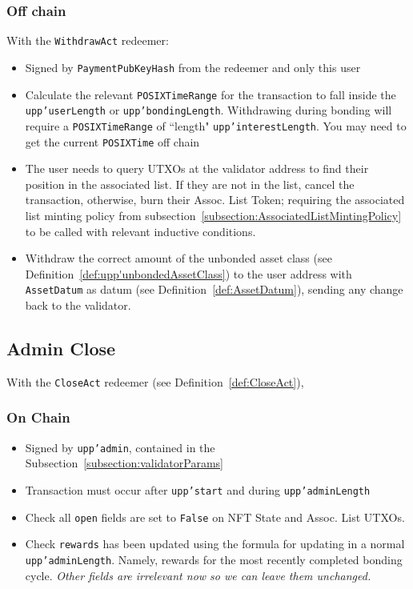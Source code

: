 \documentclass[10pt, a4paper]{article}
\theoremstyle{definition}
\begin{document}
\subsubsection{Off chain}\label{subsection:UserWithdrawOffchain}
With the \texttt{WithdrawAct} redeemer:
\begin{itemize}
\item{Signed by \texttt{PaymentPubKeyHash} from the redeemer and only this user}
\item{Calculate the relevant \texttt{POSIXTimeRange} for the transaction to fall inside the \texttt{upp'userLength} or \texttt{upp'bondingLength}. Withdrawing during bonding will require a \texttt{POSIXTimeRange} of ``length"  \texttt{upp'interestLength}. You may need to get the current \texttt{POSIXTime} off chain}
\item{The user needs to query UTXOs at the validator address to find their position in the associated list. If they are not in the list, cancel the transaction, otherwise, burn their Assoc. List Token; requiring the associated list minting policy from subsection~\ref{subsection:AssociatedListMintingPolicy} to be called with relevant inductive conditions.}
\item{Withdraw the correct amount of the unbonded asset class (see Definition~\ref{def:upp'unbondedAssetClass}) to the user address with \texttt{AssetDatum} as datum (see Definition~\ref{def:AssetDatum}), sending any change back to the validator.}
\end{itemize}
\subsection{Admin Close}
With the \texttt{CloseAct} redeemer (see Definition~\ref{def:CloseAct}), 

\subsubsection{On Chain}
\begin{itemize}
\item{Signed by \texttt{upp'admin}, contained in the Subsection~\ref{subsection:validatorParams}}
\item{Transaction must occur after \texttt{upp'start} and during \texttt{upp'adminLength}}
\item{Check all \texttt{open} fields are set to \texttt{False} on NFT State and Assoc. List UTXOs.}
\item{Check \texttt{rewards} has been updated using the formula for updating in a normal \texttt{upp'adminLength}. Namely, rewards for the most recently completed bonding cycle.}
\textit{Other fields are irrelevant now so we can leave them unchanged.}
\end{itemize}
\end{document}
